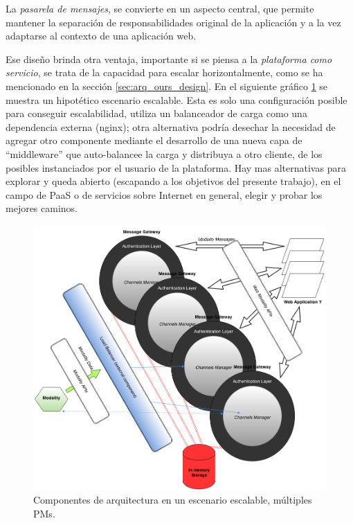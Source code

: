 La \emph{pasarela de mensajes}, se convierte en un aspecto central, que permite mantener la separación de responsabilidades original de la aplicación y a la vez adaptarse al contexto de una aplicación web.

Ese diseño brinda otra ventaja, importante si se piensa a la \emph{plataforma como servicio}, se trata de la capacidad para escalar horizontalmente, como se ha mencionado en la sección \ref{sec:arq_ours_design}. En el siguiente gráfico \ref{fig:ours_single_app_scalable_scenario} se muestra un hipotético escenario escalable. Esta es solo una configuración posible para conseguir escalabilidad, utiliza un balanceador de carga como una dependencia externa (\ie nginx); otra alternativa podría desechar la necesidad de agregar otro componente mediante el desarrollo de una nueva capa de ``middleware'' que auto-balancee la carga y distribuya a otro cliente, de los posibles instanciados por el usuario de la plataforma. Hay mas alternativas para explorar y queda abierto (escapando a los objetivos del presente trabajo), en el campo de PaaS o de servicios sobre Internet en general, elegir y probar los mejores caminos.

\begin{center}
  \begin{figure}[h]
    \includegraphics[scale=1,width=\textwidth]{gfx/arq_scalable}
    \caption{Componentes de arquitectura en un escenario escalable, múltiples PMs.}
    \label{fig:ours_single_app_scalable_scenario}
  \end{figure}
\end{center}


